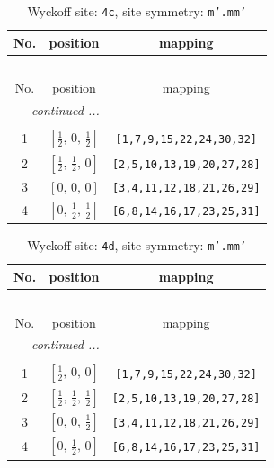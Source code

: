 \documentclass[fleqn,8pt]{jsarticle}
\begin{document}
\renewcommand{\arraystretch}{1.2}
\begin{longtable}{ccc}
\caption{Wyckoff site: {\tt 4c}, site symmetry: {\tt m'.mm'}}
 \\
 \hline \hline
No. & position & mapping \\ \hline \endfirsthead

\multicolumn{2}{l}{\tablename\ \thetable{}} \\
 \hline \hline
No. & position & mapping \\ \hline \endhead

 \hline \hline
\multicolumn{2}{r}{\footnotesize\it continued ...} \\ \endfoot

 \hline \hline
\multicolumn{2}{r}{} \\ \endlastfoot

1 & $\left[ \frac{1}{2},\, 0,\, \frac{1}{2} \right]$ & {\tt [1,7,9,15,22,24,30,32]} \\ \hline
2 & $\left[ \frac{1}{2},\, \frac{1}{2},\, 0 \right]$ & {\tt [2,5,10,13,19,20,27,28]} \\ \hline
3 & $\left[ 0,\, 0,\, 0 \right]$ & {\tt [3,4,11,12,18,21,26,29]} \\ \hline
4 & $\left[ 0,\, \frac{1}{2},\, \frac{1}{2} \right]$ & {\tt [6,8,14,16,17,23,25,31]} \\
\end{longtable}
\renewcommand{\arraystretch}{1.2}
\begin{longtable}{ccc}
\caption{Wyckoff site: {\tt 4d}, site symmetry: {\tt m'.mm'}}
 \\
 \hline \hline
No. & position & mapping \\ \hline \endfirsthead

\multicolumn{2}{l}{\tablename\ \thetable{}} \\
 \hline \hline
No. & position & mapping \\ \hline \endhead

 \hline \hline
\multicolumn{2}{r}{\footnotesize\it continued ...} \\ \endfoot

 \hline \hline
\multicolumn{2}{r}{} \\ \endlastfoot

1 & $\left[ \frac{1}{2},\, 0,\, 0 \right]$ & {\tt [1,7,9,15,22,24,30,32]} \\ \hline
2 & $\left[ \frac{1}{2},\, \frac{1}{2},\, \frac{1}{2} \right]$ & {\tt [2,5,10,13,19,20,27,28]} \\ \hline
3 & $\left[ 0,\, 0,\, \frac{1}{2} \right]$ & {\tt [3,4,11,12,18,21,26,29]} \\ \hline
4 & $\left[ 0,\, \frac{1}{2},\, 0 \right]$ & {\tt [6,8,14,16,17,23,25,31]} \\
\end{longtable}
\end{document}
